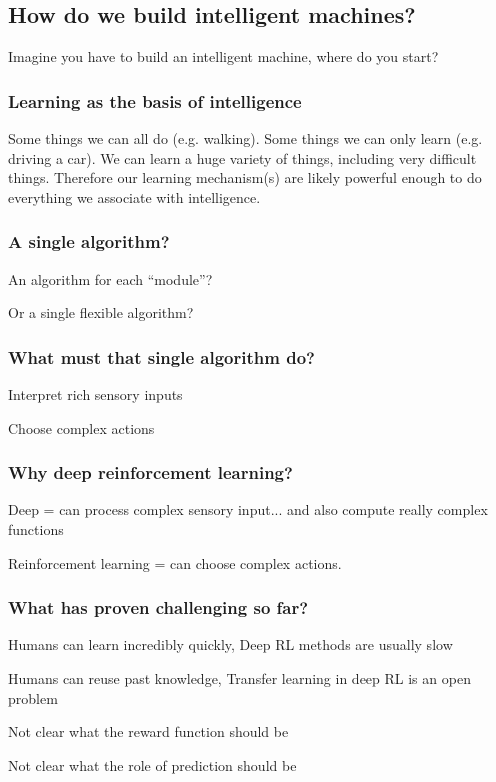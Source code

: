 \subsection{How do we build intelligent machines?}
Imagine you have to build an intelligent machine, where do you start?

\subsubsection{Learning as the basis of intelligence}
Some things we can all do (e.g. walking).
Some things we can only learn (e.g. driving a car).
We can learn a huge variety of things, including very difficult things.
Therefore our learning mechanism(s) are likely powerful enough to do
everything we associate with intelligence.

\subsubsection{A single algorithm?}
An algorithm for each “module”?

Or a single flexible algorithm?

\subsubsection{What must that single algorithm do?}
Interpret rich sensory inputs

Choose complex actions

\subsubsection{Why deep reinforcement learning?}
Deep = can process complex sensory input... and also compute really complex functions

Reinforcement learning = can choose complex actions.


\subsubsection{What has proven challenging so far?}
Humans can learn incredibly quickly, Deep RL methods are usually slow

Humans can reuse past knowledge, Transfer learning in deep RL is an open problem

Not clear what the reward function should be

Not clear what the role of prediction should be


